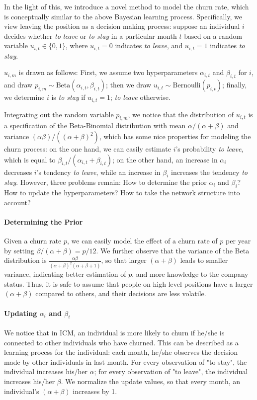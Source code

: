 \documentclass[tcn = 37075, sheet = false, abstract = false]{mcmthesis}
\begin{document}
In the light of this, we introduce a novel method to model the churn rate, which is conceptually similar to the above Bayesian learning process. Specifically, we view leaving the position as a decision making process: suppose an individual $i$ decides whether \textit{to leave} or \textit{to stay} in a particular month $t$ based on a random variable $u_{i,t} \in \{0, 1\}$, where $u_{i,t} = 0$ indicates \textit{to leave}, and $u_{i,t}=1$ indicates \textit{to stay}. 

$u_{i, m}$ is drawn as follows: First, we assume two hyperparameters $\alpha_{i, t}$ and $\beta_{i, t}$ for $i$, and draw $\displaystyle   p_{i, m} \sim \mathrm{Beta}(\alpha_{i, t}, \beta_{i, t})$; then we draw $\displaystyle u_{i, t} \sim \mathrm{Bernoulli}(p_{i, t})$; finally, we determine $i$ is \textit{to stay} if $u_{i,t}=1$; \textit{to leave} otherwise.

Integrating out the random variable $p_{i, m}$, we notice that the distribution of $u_{i, t}$ is a specification of the Beta-Binomial distribution with mean $\alpha / (\alpha + \beta)$ and variance $(\alpha\beta)/((\alpha+\beta)^2)$, which has some nice properties for modeling the churn process: on the one hand, we can easily estimate $i$'s probability \textit{to leave}, which is equal to $\beta_{i, t}/(\alpha_{i,t}+\beta_{i,t})$; on the other hand, an increase in $\alpha_i$ decreases $i$'s tendency \textit{to leave}, while an increase in $\beta_i$ increases the tendency \textit{to stay}. However, three problems remain: How to determine the prior $\alpha_i$ and $\beta_i$? How to update the hyperparameters? How to take the network structure into account?

\paragraph{Determining the Prior} Given a churn rate $p$, we can easily model the effect of a churn rate of $p$ per year by setting $\beta / (\alpha + \beta) = p / 12$. We further observe that the variance of the Beta distribution is $\displaystyle \frac{\alpha\beta}{(\alpha+\beta)^2(\alpha+\beta+1)}$, so that larger $(\alpha + \beta)$ leads to smaller variance, indicating better estimation of $p$, and more knowledge to the company status. Thus, it is safe to assume that people on high level positions have a larger $(\alpha+\beta)$ compared to others, and their decisions are less volatile.

\paragraph{Updating $\alpha_i$ and $\beta_i$} We notice that in ICM, an individual is more likely to churn if he/she is connected to other individuals who have churned. This can be described as a learning process for the individual: each month, he/she observes the decision made by other individuals in last month. For every observation of "to stay", the individual increases his/her $\alpha$; for every observation of "to leave", the individual increases his/her $\beta$. We normalize the update values, so that every month, an individual's $(\alpha+\beta)$ increases by 1.
\end{document}
